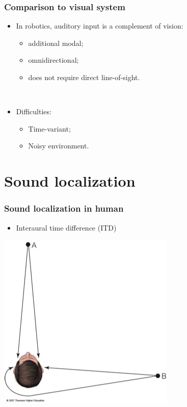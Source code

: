\documentclass{beamer}
\begin{document}
\begin{frame}
\frametitle{Comparison to visual system}
\begin{itemize}
  \item In robotics, auditory input is a complement of vision:
  \begin{itemize}
    \item additional modal;
    \item omnidirectional;
    \item does not require direct line-of-sight.
  \end{itemize}
  ~
  \item Difficulties:
  \begin{itemize}
    \item Time-variant;
    \item Noisy environment.
  \end{itemize}
\end{itemize}
\end{frame}

\section{Sound localization}
\begin{frame}
\frametitle{Sound localization in human}
\begin{itemize}
  \item Interaural time difference (ITD)
\end{itemize}
\begin{center}
  \includegraphics[width=.5\textwidth]{itd}
\end{center}
\end{frame}
\end{document}
